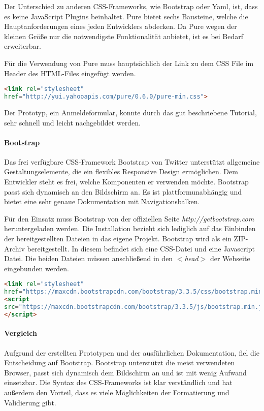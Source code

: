 Der Unterschied zu anderen CSS-Frameworks, wie Bootstrap oder Yaml, ist, dass es keine JavaScript Plugins beinhaltet. Pure bietet sechs Bausteine, welche die Hauptanforderungen eines jeden Entwicklers abdecken. Da Pure wegen der kleinen Größe nur die notwendigste Funktionalität anbietet, ist es bei Bedarf erweiterbar.

Für die Verwendung von Pure muss hauptsächlich der Link zu dem CSS File im Header des HTML-Files eingefügt werden. \cite{PURE}
\begin{lstlisting}[caption={Pure einbinden \cite{PURE}}, language=HTML]
<link rel="stylesheet" 
href="http://yui.yahooapis.com/pure/0.6.0/pure-min.css">
\end{lstlisting}

Der Prototyp, ein Anmeldeformular, konnte durch das gut beschriebene Tutorial, sehr schnell und leicht nachgebildet werden.

\paragraph{Bootstrap}
Das frei verfügbare CSS-Framework Bootstrap von Twitter unterstützt allgemeine Gestaltungselemente, die ein flexibles Responsive Design ermöglichen. Dem Entwickler steht es frei, welche Komponenten er verwenden möchte. Bootstrap passt sich dynamisch an den Bildschirm an. Es ist plattformunabhängig und bietet eine sehr genaue Dokumentation mit Navigationsbalken.

\newpage

Für den Einsatz muss Bootstrap von der offiziellen Seite \textit{http://getbootstrap.com} heruntergeladen werden. Die Installation bezieht sich lediglich auf das Einbinden der bereitgestellten Dateien in das eigene Projekt. Bootstrap wird als ein ZIP-Archiv bereitgestellt. In diesem befindet sich eine CSS-Datei und eine Javascript Datei. Die beiden Dateien müssen anschließend in den \textit{$<$head$>$} der Webseite eingebunden werden. \cite{BOOTSTRAP}
\begin{lstlisting}[caption={Bootstrap einbinden \cite{BOOTSTRAP}}, language=HTML]
<link rel="stylesheet"
href="https://maxcdn.bootstrapcdn.com/bootstrap/3.3.5/css/bootstrap.min.css">
<script 
src="https://maxcdn.bootstrapcdn.com/bootstrap/3.3.5/js/bootstrap.min.js">
</script>
\end{lstlisting}

\paragraph{Vergleich}
Aufgrund der erstellten Prototypen und der ausführlichen Dokumentation, fiel die Entscheidung auf Bootstrap. Bootstrap unterstützt die meist verwendeten Browser, passt sich dynamisch dem Bildschirm an und ist mit wenig Aufwand einsetzbar. Die Syntax des CSS-Frameworks ist klar verständlich und hat außerdem den Vorteil, dass es viele Möglichkeiten der Formatierung und Validierung gibt.

